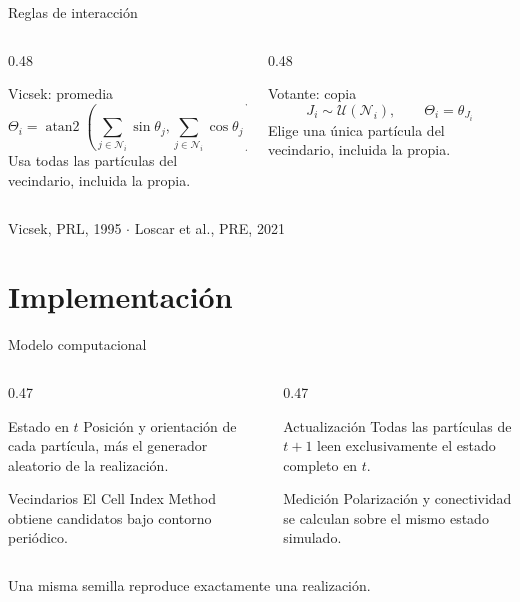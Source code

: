 \documentclass[aspectratio=169,11pt]{beamer}
\begin{document}
\begin{frame}{Reglas de interacción}
  \begin{columns}[T,onlytextwidth]
    \begin{column}{0.48\textwidth}
      \begin{block}{Vicsek: promedia}
        \[
          \Theta_i=\operatorname{atan2}\!\left(
          \sum_{j\in\mathcal N_i}\sin\theta_j,
          \sum_{j\in\mathcal N_i}\cos\theta_j\right)
        \]
        Usa todas las partículas del vecindario, incluida la propia.
      \end{block}
    \end{column}
    \begin{column}{0.48\textwidth}
      \begin{block}{Votante: copia}
        \[
          J_i\sim\mathcal U(\mathcal N_i),\qquad
          \Theta_i=\theta_{J_i}
        \]
        Elige una única partícula del vecindario, incluida la propia.
      \end{block}
    \end{column}
  \end{columns}
  \vfill
  \centering\scriptsize Vicsek, PRL, 1995 \quad $\cdot$ \quad Loscar et al., PRE, 2021
\end{frame}

\section{Implementación}
\begin{frame}
  \sectionpage
\end{frame}

\begin{frame}{Modelo computacional}
  \begin{columns}[T,onlytextwidth]
    \begin{column}{0.47\textwidth}
      \begin{block}{Estado en $t$}
        Posición y orientación de cada partícula, más el generador aleatorio de la realización.
      \end{block}
      \begin{block}{Vecindarios}
        El Cell Index Method obtiene candidatos bajo contorno periódico.
      \end{block}
    \end{column}
    \begin{column}{0.47\textwidth}
      \begin{block}{Actualización}
        Todas las partículas de $t+1$ leen exclusivamente el estado completo en $t$.
      \end{block}
      \begin{block}{Medición}
        Polarización y conectividad se calculan sobre el mismo estado simulado.
      \end{block}
    \end{column}
  \end{columns}
  \vfill
  \centering\alert{Una misma semilla reproduce exactamente una realización.}
\end{frame}
\end{document}
